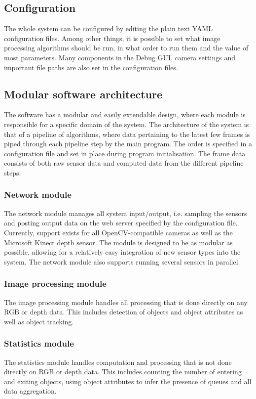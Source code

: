 \subsection{Configuration}
The whole system can be configured by editing the plain text YAML configuration files. Among other things, it is possible to set what image processing algorithms should be run, in what order to run them and the value of most parameters. Many components in the Debug GUI, camera settings and important file paths are also set in the configuration files. 

\subsection{Modular software architecture}
The software has a modular and easily extendable design, where each module is responsible for a specific domain of the system. The architecture of the system is that of a pipeline of algorithms, where data pertaining to the latest few frames is piped through each pipeline step by the main program. The order is specified in a configuration file and set in place during program initialisation. The frame data consists of both raw sensor data and computed data from the different pipeline steps. 

\subsubsection{Network module}
The network module manages all system input/output, i.e. sampling the sensors and posting output data on the web server specified by the configuration file. Currently, support exists for all OpenCV-compatible cameras as well as the Microsoft Kinect depth sensor. The module is designed to be as modular as possible, allowing for a relatively easy integration of new sensor types into the system. The network module also supports running several sensors in parallel. 

\subsubsection{Image processing module}
The image processing module handles all processing that is done directly on any RGB or depth data. This includes detection of objects and object attributes as well as object tracking.

\subsubsection{Statistics module}
The statistics module handles computation and processing that is not done directly on RGB or depth data. This includes counting the number of entering and exiting objects, using object attributes to infer the presence of queues and all data aggregation. 

